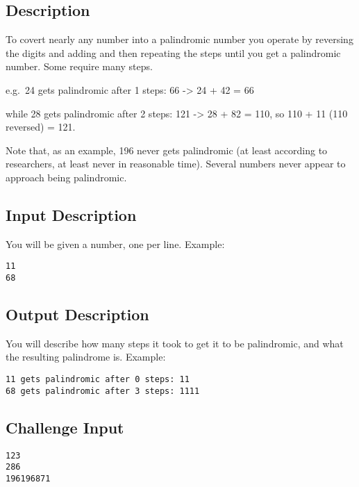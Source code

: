 \subsection*{Description}\label{description-5}

To covert nearly any number into a palindromic number you operate by
reversing the digits and adding and then repeating the steps until you
get a palindromic number. Some require many steps.

e.g.~24 gets palindromic after 1 steps: 66 -\textgreater{} 24 + 42 = 66

while 28 gets palindromic after 2 steps: 121 -\textgreater{} 28 + 82 =
110, so 110 + 11 (110 reversed) = 121.

Note that, as an example, 196 never gets palindromic (at least according
to researchers, at least never in reasonable time). Several numbers
never appear to approach being palindromic.

\subsection*{Input Description}\label{input-description-4}

You will be given a number, one per line. Example:

\begin{lstlisting}
11
68
\end{lstlisting}

\subsection*{Output Description}\label{output-description-4}

You will describe how many steps it took to get it to be palindromic,
and what the resulting palindrome is. Example:

\begin{lstlisting}
11 gets palindromic after 0 steps: 11
68 gets palindromic after 3 steps: 1111
\end{lstlisting}

\subsection*{Challenge Input}\label{challenge-input-5}

\begin{lstlisting}
123
286
196196871
\end{lstlisting}


